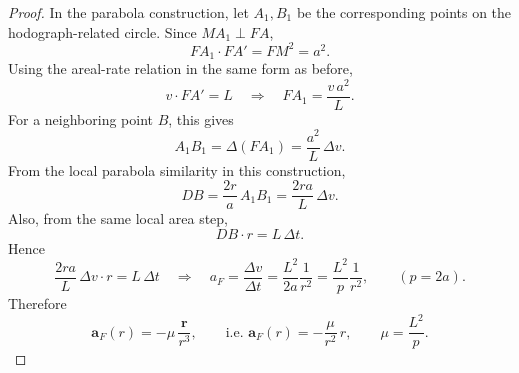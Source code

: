 \begin{proof}
In the parabola construction, let $A_1,B_1$ be the corresponding points on the hodograph-related circle. Since $MA_1\perp FA$,
\[
  FA_1\cdot FA' = FM^2 = a^2.
\]
Using the areal-rate relation in the same form as before,
\[
  v\cdot FA' = L
  \quad\Longrightarrow\quad
  FA_1=\frac{v\,a^2}{L}.
\]
For a neighboring point $B$, this gives
\[
  A_1B_1=\Delta(FA_1)=\frac{a^2}{L}\,\Delta v.
\]
From the local parabola similarity in this construction,
\[
  DB=\frac{2r}{a}\,A_1B_1
  =\frac{2ra}{L}\,\Delta v.
\]
Also, from the same local area step,
\[
  DB\cdot r = L\,\Delta t.
\]
Hence
\[
  \frac{2ra}{L}\,\Delta v\cdot r=L\,\Delta t
  \quad\Longrightarrow\quad
  a_F=\frac{\Delta v}{\Delta t}
  =\frac{L^2}{2a}\frac{1}{r^2}
  =\frac{L^2}{p}\frac{1}{r^2},
  \qquad (p=2a).
\]
Therefore
\[
  \mathbf a_F(r)=-\mu\,\frac{\mathbf r}{r^3},
  \qquad
  \text{i.e. }\mathbf a_F(r)=-\frac{\mu}{r^2}\,\hat r,
  \qquad
  \mu=\frac{L^2}{p}.
\]
\end{proof}
